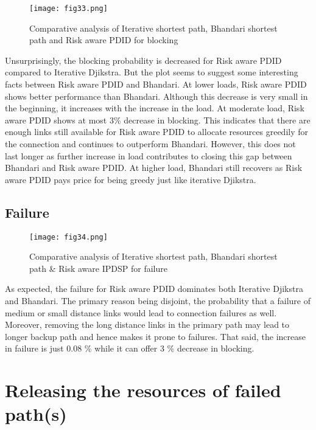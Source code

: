 \begin{figure}[hbt!]
\centering
\texttt{[image: fig33.png]}
\caption{Comparative analysis of Iterative shortest path, Bhandari shortest path and Risk aware PDID for blocking}
\label{fig:all3Block}
\end{figure}

	Unsurprisingly, the blocking probability is decreased for Risk aware PDID compared to Iterative Djikstra. But the plot seems to suggest some interesting facts between Risk aware PDID and Bhandari. At lower loads, Risk aware PDID shows better performance than Bhandari. Although this decrease is very small in the beginning, it increases with the increase in the load. At moderate load, Risk aware PDID shows at most 3\% decrease in blocking. This indicates that there are enough links still available for Risk aware PDID to allocate resources greedily for the connection and continues to outperform Bhandari. However, this does not last longer as further increase in load contributes to closing this gap between Bhandari and Risk aware PDID. At higher load, Bhandari still recovers as Risk aware PDID pays price for being greedy just like iterative Djikstra. 

\subsection {Failure}

\begin{figure}[hbt!]
\centering
\texttt{[image: fig34.png]}
\caption{Comparative analysis of Iterative shortest path, Bhandari shortest path & Risk aware IPDSP for failure}
\label{fig:all3Fail}
\end{figure}

	As expected, the failure for Risk aware PDID dominates both Iterative Djikstra and Bhandari. The primary reason being disjoint, the probability that a failure of medium or small distance links would lead to connection failures as well. Moreover, removing the long distance links in the primary path may lead to longer backup path and hence makes it prone to failures. That said, the increase in failure is just 0.08 \% while it can offer 3 \% decrease in blocking.

	     
\section {Releasing the resources of failed path(s)}

